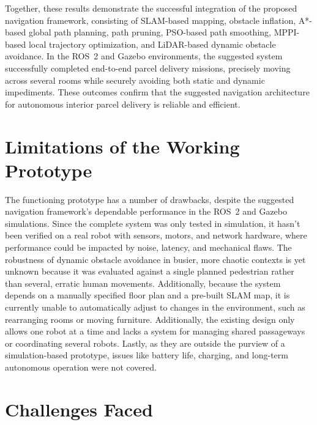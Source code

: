 Together, these results demonstrate the successful integration of the proposed navigation framework, consisting of SLAM-based mapping, obstacle inflation, A*-based global path planning, path pruning, PSO-based path smoothing, MPPI-based local trajectory optimization, and LiDAR-based dynamic obstacle avoidance. In the ROS~2 and Gazebo environments, the suggested system successfully completed end-to-end parcel delivery missions, precisely moving across several rooms while securely avoiding both static and dynamic impediments. These outcomes confirm that the suggested navigation architecture for autonomous interior parcel delivery is reliable and efficient.


\section{Limitations of the Working Prototype}

The functioning prototype has a number of drawbacks, despite the suggested navigation framework's dependable performance in the ROS~2 and Gazebo simulations. Since the complete system was only tested in simulation, it hasn't been verified on a real robot with sensors, motors, and network hardware, where performance could be impacted by noise, latency, and mechanical flaws. The robustness of dynamic obstacle avoidance in busier, more chaotic contexts is yet unknown because it was evaluated against a single planned pedestrian rather than several, erratic human movements. Additionally, because the system depends on a manually specified floor plan and a pre-built SLAM map, it is currently unable to automatically adjust to changes in the environment, such as rearranging rooms or moving furniture.
Additionally, the existing design only allows one robot at a time and lacks a system for managing shared passageways or coordinating several robots. Lastly, as they are outside the purview of a simulation-based prototype, issues like battery life, charging, and long-term autonomous operation were not covered.

\section{Challenges Faced}

